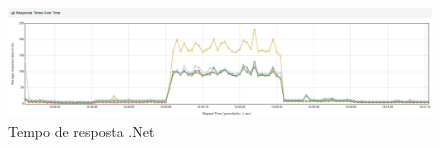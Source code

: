 \documentclass{libs/ufc_format}
\begin{document}
\begin{frame}{}
    \begin{figure}[H]
        \centering
        \caption{Tempo de resposta .Net}
        \includegraphics[width=1\linewidth]{figuras/tempo-resposta-pico-dotnet.png}
        \captionsetup{justification=centering}
    \end{figure}
\end{frame}
\end{document}
